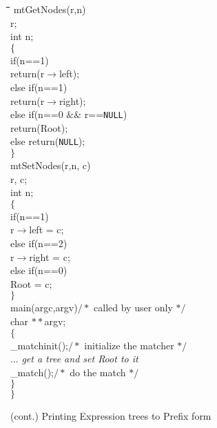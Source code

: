 \addtocounter{figure}{-1}
\begin{figure}[tp]
\begin{tabbing}
\hspace{1in}\=\hspace{1in}\=\hspace{1in}\=\hspace{1in}\=
\hspace{1in}\=\hspace{1in}\=\hspace{1in}\=\hspace{1in}\=\kill
mtGetNodes(r,n)\\
 r;\\
\>int n;\\
$\{$\\
\>if(n==1)\\
\>\>return(r$\to$left);\\
\>else if(n==1)\\
\>\>return(r$\to$right);\\
\>else if(n==0 $\&\&$ r=={\tt NULL})\\
\>\>return(Root);\\
\>else return({\tt NULL});\\
$\}$\\[4pt]
mtSetNodes(r,n, c)\\
 r, c;\\
\>int n;\\
$\{$\\
\>if(n==1)\\
\>\>r$\to$left = c;\\
\>else if(n==2)\\
\>\>r$\to$right = c;\\
\>else if(n==0)\\
\>\>Root = c;\\
$\}$\\[4pt]
main(argc,argv)\>\>\>$/*$ called by user only $*/$\\
\>char $**$argv;\\
$\{$\\
\>\_matchinit();\>\>$/*$ initialize the matcher $*/$\\
\>$...$ {\sl get a tree and set Root to it}\\
\>\_match();\>\>$/*$ do the match $*/$\\
$\}$\\
$\}$\\
\end{tabbing}
\caption{(cont.) Printing Expression trees to Prefix form}
\label{trees:prefix}
\end{figure}

